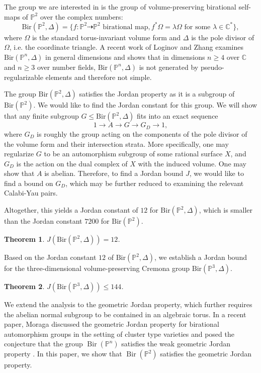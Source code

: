 \documentclass[a4paper,12pt,oneside]{amsart}
\numberwithin{equation}{section}
\newtheorem{theorem}{Theorem}[section]
\theoremstyle{definition}
\theoremstyle{remark}
\newcommand{\PP}{\mathbb{P}}
\newcommand{\Ptwo}{\mathbb{P}^2}
\newcommand{\CC}{\mathbb{C}}
\newcommand{\Bir}{\mathrm{Bir}}
\begin{document}
The group we are interested in is the group of volume-preserving birational self-maps of $\mathbb{P}^2$ over the complex numbers:
\[
\mathrm{Bir}(\mathbb{P}^2,\Delta) = \{ f: \Ptwo \dashrightarrow \Ptwo \text{ birational map}, f^*\Omega = \lambda \Omega \text{ for some }\lambda\in \mathbb C^* \},
\]
where $\Omega$ is the standard torus-invariant volume form and $\Delta$ is the pole divisor of $\Omega$, i.e. the coordinate triangle. A recent work of Loginov and Zhang \cite{loginov2024birationalinvariantsvolumepreserving} examines $\Bir(\PP^n,\Delta)$ in general dimensions and shows that in dimensions $n\geq4$
over $\CC$ and $n\geq 3$ over number fields, $\Bir(\PP^n, \Delta)$ is not generated by pseudo-regularizable elements and therefore not simple.


The group $\mathrm{Bir}(\mathbb{P}^2,\Delta)$ satisfies the Jordan property as it is a subgroup of $\mathrm{Bir}(\mathbb{P}^2)$. We would like to find the Jordan constant for this group. We will show that any finite subgroup $G
\leqslant \Bir(\PP^2, \Delta)$ fits into an exact sequence
\[
1 \to A \to G \to G_D \to 1,
\]
where $G_D$ is roughly the group acting on the components of the pole divisor of the volume form and their intersection strata. More specifically, one may regularize $G$ to be an automorphism subgroup of some rational surface $X$, and $G_D$ is the action on the dual complex of $X$ with the induced volume. One may show that $A$ is abelian. Therefore, to find a Jordan bound $J$, we would like to find a bound on $G_D$, which may be further reduced to examining the relevant Calabi-Yau pairs. 

Altogether, this yields a Jordan constant of $12$ for $\Bir(\Ptwo, \Delta)$, which is smaller than the Jordan constant $7200$ for $\mathrm{Bir}(\mathbb{P}^2)$.



\begin{theorem}\label{thmd}
$J(\mathrm{Bir}(\Ptwo, \Delta))=12$.
\end{theorem}

Based on the Jordan constant $12$ of $\mathrm{Bir}(\mathbb{P}^2, \Delta)$, we establish a Jordan bound for the three-dimensional volume-preserving Cremona group $\mathrm{Bir}(\mathbb{P}^3, \Delta)$.
\begin{theorem} \label{thmthree}
$J(\mathrm{Bir}(\mathbb P^3, \Delta)) \leq 144$.
\end{theorem}

We extend the analysis to the geometric Jordan property, which further requires the abelian normal subgroup to be contained in an algebraic torus. In a recent paper, Moraga discussed the geometric Jordan property for birational automorphism groups in the setting of cluster type varieties and posed the conjecture that the group \(\operatorname{Bir}(\mathbb{P}^n)\) satisfies the weak geometric Jordan property \cite[Conjecture 8.5]{moraga}. In this paper, we show that \(\operatorname{Bir}(\mathbb{P}^2)\) satisfies the geometric Jordan property.
\end{document}

